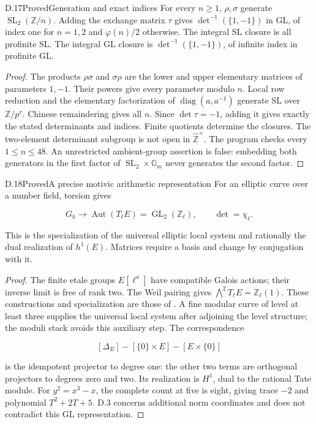 \begin{statement}{D.17}{Proved}{Generation and exact indices}
For every $n\ge1$, $\rho,\sigma$ generate
$\operatorname{SL}_2(\mathbb Z/n)$.
Adding the exchange matrix $\tau$ gives
$\det^{-1}(\{1,-1\})$ in GL, of index one for $n=1,2$
and $\varphi(n)/2$ otherwise.
The integral SL closure is all profinite SL.
The integral GL closure is $\det^{-1}(\{1,-1\})$,
of infinite index in profinite GL.
\end{statement}
\begin{proof}
The products $\rho\sigma$ and $\sigma\rho$ are the lower
and upper elementary matrices of parameters $1,-1$.
Their powers give every parameter modulo $n$.
Local row reduction and the elementary factorization of
$\operatorname{diag}(a,a^{-1})$ generate SL over
$\mathbb Z/p^r$. Chinese remaindering gives all $n$.
Since $\det\tau=-1$, adding it gives exactly the stated
determinants and indices. Finite quotients determine
the closures. The two-element determinant subgroup is
not open in $\widehat{\mathbb Z}^{\times}$.
The program checks every $1\le n\le48$.
An unrestricted ambient-group assertion is false:
embedding both generators in the first factor of
$\operatorname{SL}_2\times\mathbb G_m$ never generates
the second factor.
\end{proof}

\begin{statement}{D.18}{Proved}{A precise motivic arithmetic representation}
For an elliptic curve over a number field, torsion gives

$$
G_k\to\operatorname{Aut}(T_\ell E)
       =\operatorname{GL}_2(\mathbb Z_\ell),\qquad\det=\chi_\ell.
$$

This is the specialization of the universal elliptic local
system and rationally the dual realization of $h^1(E)$.
Matrices require a basis and change by conjugation with it.
\end{statement}
\begin{proof}
The finite etale groups $E[\ell^a]$ have compatible Galois
actions; their inverse limit is free of rank two.
The Weil pairing gives
$\bigwedge^2T_\ell E=\mathbb Z_\ell(1)$.
These constructions and specialization are those of
\cite[II, Section 6; V, Sections 7--8]{D_MilneEC}.
A fine modular curve of level at least three supplies
the universal local system after adjoining the level
structure; the moduli stack avoids this auxiliary step.
The correspondence

$$
[\Delta_E]-[\{0\}\times E]-[E\times\{0\}]
$$

is the idempotent projector to degree one: the other
two terms are orthogonal projectors to degrees zero and
two. Its realization is $H^1$, dual to the rational
Tate module. For $y^2=x^3-x$, the complete count at five
is eight, giving trace $-2$ and polynomial $T^2+2T+5$.
D.3 concerns additional norm coordinates and does not
contradict this GL representation.
\end{proof}

